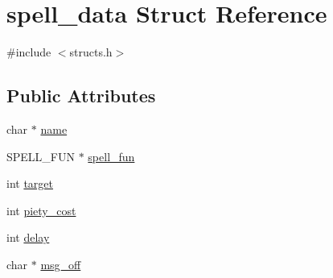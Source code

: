 \hypertarget{structspell__data}{\section{spell\-\_\-data Struct Reference}
\label{structspell__data}
}


{\ttfamily \#include $<$structs.\-h$>$}

\subsection*{Public Attributes}
\begin{DoxyCompactItemize}
\item 
char $\ast$ \hyperlink{structspell__data_a89508e1eae34147448b293496e95ccfc}{name}
\item 
S\-P\-E\-L\-L\-\_\-\-F\-U\-N $\ast$ \hyperlink{structspell__data_a330ef35c27c31ce4676ff7cb93cdaa64}{spell\-\_\-fun}
\item 
int \hyperlink{structspell__data_ac2e0d321db318e6290cb85aef4074918}{target}
\item 
int \hyperlink{structspell__data_a97c8e1276ff4e5b1b07f2766c619c7dd}{piety\-\_\-cost}
\item 
int \hyperlink{structspell__data_a7223664497a8ecd687bc91b6d5d1f226}{delay}
\item 
char $\ast$ \hyperlink{structspell__data_a0f91bd1c3c4a450403d23be5c00a0b71}{msg\-\_\-off}
\end{DoxyCompactItemize}


